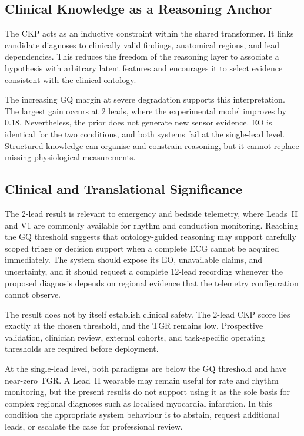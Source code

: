 \documentclass{ssnreview}
\begin{document}
\subsection{Clinical Knowledge as a Reasoning Anchor}

The CKP acts as an inductive constraint within the shared transformer. It links candidate
diagnoses to clinically valid findings, anatomical regions, and lead dependencies. This
reduces the freedom of the reasoning layer to associate a hypothesis with arbitrary latent
features and encourages it to select evidence consistent with the clinical ontology.

The increasing GQ margin at severe degradation supports this interpretation. The largest
gain occurs at 2 leads, where the experimental model improves by 0.18. Nevertheless, the
prior does not generate new sensor evidence. EO is identical for the two conditions, and
both systems fail at the single-lead level. Structured knowledge can organise and constrain
reasoning, but it cannot replace missing physiological measurements.

\subsection{Clinical and Translational Significance}

The 2-lead result is relevant to emergency and bedside telemetry, where Leads~II and V1
are commonly available for rhythm and conduction monitoring. Reaching the GQ threshold
suggests that ontology-guided reasoning may support carefully scoped triage or decision
support when a complete ECG cannot be acquired immediately. The system should expose
its EO, unavailable claims, and uncertainty, and it should request a complete 12-lead
recording whenever the proposed diagnosis depends on regional evidence that the telemetry
configuration cannot observe.

The result does not by itself establish clinical safety. The 2-lead CKP score lies exactly
at the chosen threshold, and the TGR remains low. Prospective validation, clinician review,
external cohorts, and task-specific operating thresholds are required before deployment.

At the single-lead level, both paradigms are below the GQ threshold and have near-zero
TGR. A Lead~II wearable may remain useful for rate and rhythm monitoring, but the
present results do not support using it as the sole basis for complex regional diagnoses
such as localised myocardial infarction. In this condition the appropriate system behaviour
is to abstain, request additional leads, or escalate the case for professional review.
\end{document}
